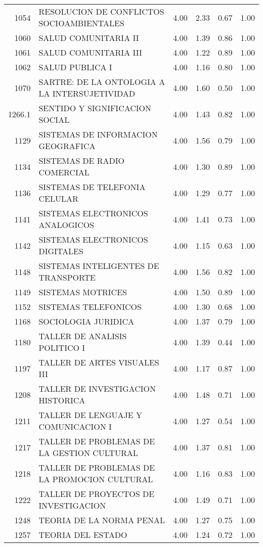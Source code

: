 \documentclass[12pt]{article}
\begin{document}
\begin{table}[ht]
\begin{tabular}{rlrrrr}
  1054 & RESOLUCION DE CONFLICTOS SOCIOAMBIENTALES & 4.00 & 2.33 & 0.67 & 1.00 \\ 
  1060 & SALUD COMUNITARIA II & 4.00 & 1.39 & 0.86 & 1.00 \\ 
  1061 & SALUD COMUNITARIA III & 4.00 & 1.22 & 0.89 & 1.00 \\ 
  1062 & SALUD PUBLICA I & 4.00 & 1.16 & 0.80 & 1.00 \\ 
  1070 & SARTRE: DE LA ONTOLOGIA A LA INTERSUJETIVIDAD & 4.00 & 1.60 & 0.50 & 1.00 \\ 
  1266.1 & SENTIDO Y SIGNIFICACION SOCIAL & 4.00 & 1.43 & 0.82 & 1.00 \\ 
  1129 & SISTEMAS DE INFORMACION GEOGRAFICA & 4.00 & 1.56 & 0.79 & 1.00 \\ 
  1134 & SISTEMAS DE RADIO COMERCIAL & 4.00 & 1.30 & 0.89 & 1.00 \\ 
  1136 & SISTEMAS DE TELEFONIA CELULAR & 4.00 & 1.29 & 0.77 & 1.00 \\ 
  1141 & SISTEMAS ELECTRONICOS ANALOGICOS & 4.00 & 1.41 & 0.73 & 1.00 \\ 
  1142 & SISTEMAS ELECTRONICOS DIGITALES & 4.00 & 1.15 & 0.63 & 1.00 \\ 
  1148 & SISTEMAS INTELIGENTES DE TRANSPORTE & 4.00 & 1.56 & 0.82 & 1.00 \\ 
  1149 & SISTEMAS MOTRICES & 4.00 & 1.50 & 0.89 & 1.00 \\ 
  1152 & SISTEMAS TELEFONICOS & 4.00 & 1.30 & 0.68 & 1.00 \\ 
  1168 & SOCIOLOGIA JURIDICA & 4.00 & 1.37 & 0.79 & 1.00 \\ 
  1180 & TALLER DE ANALISIS POLITICO I & 4.00 & 1.39 & 0.44 & 1.00 \\ 
  1197 & TALLER DE ARTES VISUALES III & 4.00 & 1.17 & 0.87 & 1.00 \\ 
  1208 & TALLER DE INVESTIGACION HISTORICA & 4.00 & 1.48 & 0.71 & 1.00 \\ 
  1211 & TALLER DE LENGUAJE Y COMUNICACION I & 4.00 & 1.27 & 0.54 & 1.00 \\ 
  1217 & TALLER DE PROBLEMAS DE LA GESTION CULTURAL & 4.00 & 1.37 & 0.81 & 1.00 \\ 
  1218 & TALLER DE PROBLEMAS DE LA PROMOCION CULTURAL & 4.00 & 1.16 & 0.83 & 1.00 \\ 
  1222 & TALLER DE PROYECTOS DE INVESTIGACION & 4.00 & 1.49 & 0.71 & 1.00 \\ 
  1248 & TEORIA DE LA NORMA PENAL & 4.00 & 1.27 & 0.75 & 1.00 \\ 
  1257 & TEORIA DEL ESTADO & 4.00 & 1.24 & 0.72 & 1.00 \\ 

\end{tabular}
\end{table}
\end{document}
